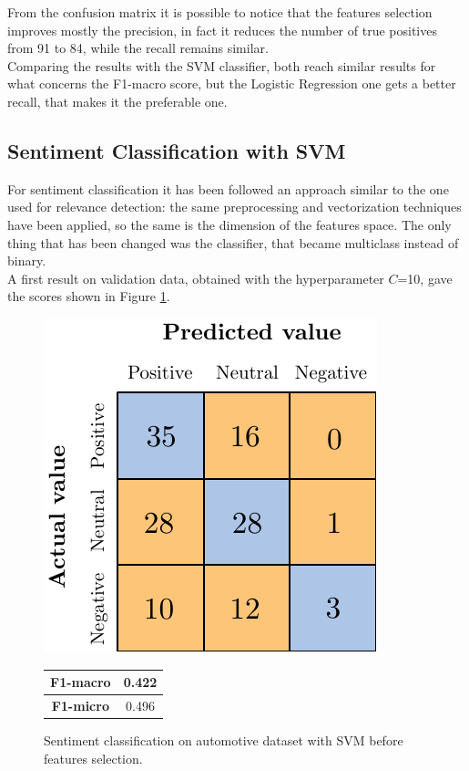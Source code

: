 From the confusion matrix it is possible to notice that the features selection improves mostly the precision, in fact it reduces the number of true positives from 91 to 84, while the recall remains similar.\\
Comparing the results with the SVM classifier, both reach similar results for what concerns the F1-macro score, but the Logistic Regression one gets a better recall, that makes it the preferable one.



\subsection{Sentiment Classification with SVM}

For sentiment classification it has been followed an approach similar to the one used for relevance detection: the same preprocessing and vectorization techniques have been applied, so the same is the dimension of the features space. The only thing that has been changed was the classifier, that became multiclass instead of binary. \\
A first result on validation data, obtained with the hyperparameter $C$=10, gave the scores shown in Figure \ref{fig:ita_snt_svm_bfs}.

\begin{figure}[H]
	\begin{minipage}[b]{0.6\linewidth}
		\centering
		\includegraphics[scale=1]{figures/conf_matrices/ita_snt_svm/ita_snt_svm_bfs.pdf}
	\end{minipage}
	\begin{minipage}[b]{0.3\linewidth}
		\begin{tabular}[b]{ | c | c | } 
			\hline
			\textbf{F1-macro} & 0.422 \\
			\hline
			\textbf{F1-micro} & 0.496 \\ 
			\hline
		\end{tabular}
	\end{minipage}
	\caption{Sentiment classification on automotive dataset with SVM before features selection.}
	\label{fig:ita_snt_svm_bfs}
\end{figure}


